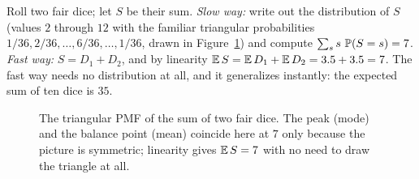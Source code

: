 \begin{example}
\label{ch08:ex-two-dice}
Roll two fair dice; let $S$ be their sum. \emph{Slow way:} write out the
distribution of $S$ (values $2$ through $12$ with the familiar triangular
probabilities $1/36, 2/36, \dots, 6/36, \dots, 1/36$, drawn in
Figure~\ref{ch08:fig-two-dice}) and compute $\sum_s s\,\P(S=s) = 7$. \emph{Fast way:} $S = D_1 + D_2$, and by linearity
$\E S = \E D_1 + \E D_2 = 3.5 + 3.5 = 7$. The fast way needs no distribution at
all, and it generalizes instantly: the expected sum of ten dice is $35$.
\end{example}

\begin{figure}[H]
\centering
{}
\caption{The triangular PMF of the sum of two fair dice. The peak (mode) and the
balance point (mean) coincide here at $7$ only because the picture is symmetric;
linearity gives $\E S = 7$ with no need to draw the triangle at all.}
\label{ch08:fig-two-dice}
\end{figure}

